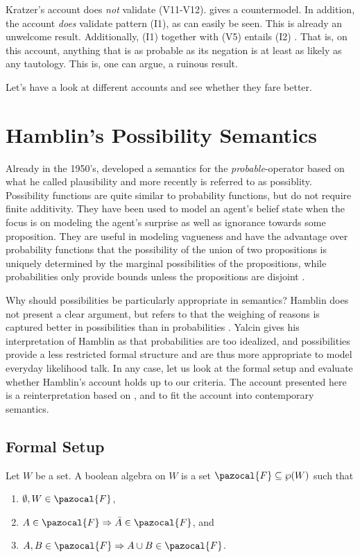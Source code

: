 \documentclass{article}
\theoremstyle{definition}
\newcommand{\F}{\pazocal{F}}
\begin{document}
Kratzer's account does \emph{not} validate (V11-V12). \textcite[pp.~935, note~8]{yalcin10_probab_operat} gives a countermodel.
In addition, the account \emph{does} validate pattern (I1), as can easily be seen. This is already an unwelcome result. Additionally, (I1) together with (V5) entails (I2) \parencite[p.~922]{yalcin10_probab_operat}. That is, on this account, anything that is as probable as its negation is at least as likely as any tautology. This is, one can argue, a ruinous result.

Let's have a look at different accounts and see whether they fare better.

\section{Hamblin's Possibility Semantics}
Already in the 1950's, \textcite{hamblin59_modal_probab} developed a semantics for the \emph{probable}-operator based on what he called plausibility and more recently is referred to as possiblity. Possibility functions are quite similar to probability functions, but do not require finite additivity. They have been used to model an agent's belief state when the focus is on modeling the agent's surprise as well as ignorance towards some proposition. They are useful in modeling vagueness and have the advantage over probability functions that the possibility of the union of two propositions is uniquely determined by the marginal possibilities of the propositions, while probabilities only provide bounds unless the propositions are disjoint \parencite[][p.~45]{halpern03_reason_about_uncer}.

Why should possibilities be particularly appropriate in semantics? Hamblin does not present a clear argument, but refers to that the weighing of reasons is captured better in possibilities than in probabilities \parencite[][p.~240]{hamblin59_modal_probab}.
Yalcin gives his interpretation of Hamblin as that probabilities are too idealized, and possibilities provide a less restricted formal structure and are thus more appropriate to model everyday likelihood talk.
In any case, let us look at the formal setup and evaluate whether Hamblin's account holds up to our criteria. 
The account presented here is a reinterpretation based on \textcite{hamblin59_modal_probab}, \textcite[][pp.~42]{halpern03_reason_about_uncer} and \textcite{yalcin10_probab_operat} to fit the account into contemporary semantics.

\subsection{Formal Setup}
\noindent Let $W$ be a set. A boolean algebra on $W$ is a set $\F \subseteq \wp(W)$ such that
\begin{enumerate}[nosep]
  \item $\emptyset, W \in \F$,
  \item $A \in \F \Rightarrow \bar{A} \in \F$, and
  \item $A,B \in \F \Rightarrow A \cup B \in \F$.
\end{enumerate}
\end{document}
